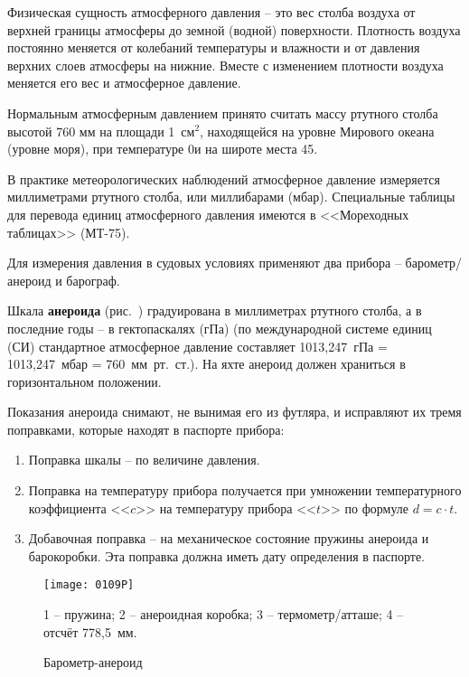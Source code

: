 Физическая сущность атмосферного давления \--- это вес столба воздуха
от верхней границы атмосферы до земной (водной) поверхности. Плотность
воздуха постоянно меняется от колебаний температуры и влажности и от
давления верхних слоев атмосферы на нижние. Вместе с изменением
плотности воздуха меняется его вес и атмосферное давление.

Нормальным атмосферным давлением принято считать массу ртутного столба
высотой 760 мм на площади 1~см$^2$, находящейся на уровне Мирового
океана (уровне моря), при температуре 0\grC и на широте места 45\gr.

В практике метеорологических наблюдений атмосферное давление
измеряется миллиметрами ртутного столба, или миллибарами
(мбар). Специальные таблицы для перевода единиц атмосферного давления
имеются в <<Мореходных таблицах>> (МТ-75).

Для измерения давления в судовых условиях применяют два прибора \---
барометр\-/анероид и барограф.

Шкала \textbf{анероида} (рис.~)
градуирована в миллиметрах ртутного столба, а в последние годы \--- в
гектопаскалях (гПа) (по международной системе единиц (СИ) стандартное
атмосферное давление составляет 1013,247~гПа = 1013,247~мбар =
760~мм~рт.~ст.). На яхте анероид должен храниться в горизонтальном
положении.

Показания анероида снимают, не вынимая его из футляра, и исправляют их
тремя поправками, которые находят в паспорте прибора:

\begin{enumerate}
\item Поправка шкалы \--- по величине давления. 
\item Поправка на температуру прибора получается при умножении
  температурного коэффициента <<$c$>> на температуру прибора <<$t$>>
  по формуле $d = c \cdot t$.
\item Добавочная поправка \--- на механическое состояние пружины
  анероида и барокоробки. Эта поправка должна иметь дату определения в
  паспорте.
\end{enumerate}

\begin{figure}[htb]
  \centering{}
  \texttt{[image: 0109P]}
  \caption{Барометр-анероид}
  \label{fig:109}
  \small
  \centering{}
  1 \--- пружина; 2 \--- анероидная коробка; 3 \--- термометр\-/атташе; 4 \--- отсчёт 778,5~мм. 
\end{figure}

